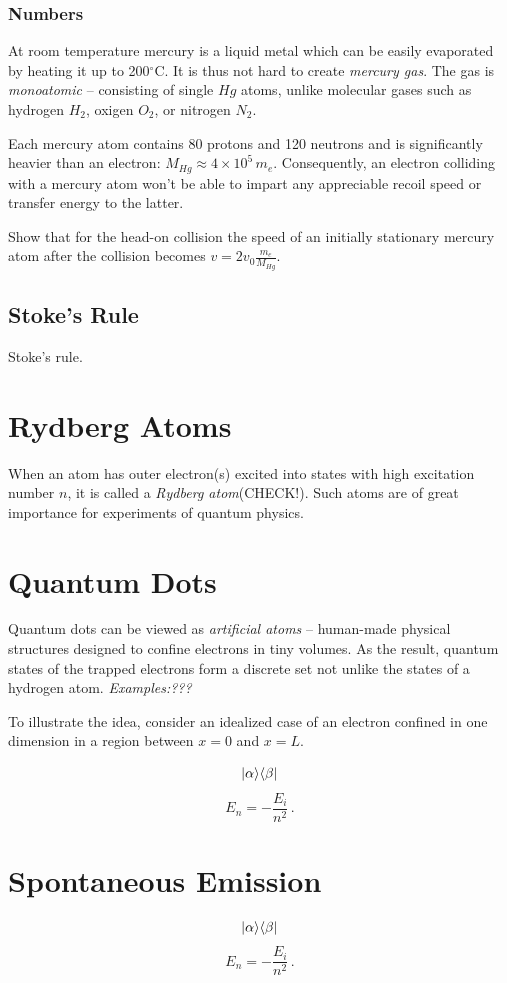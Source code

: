 \subsubsection*{Numbers}
At room temperature mercury is a liquid metal which can be easily evaporated by heating it up to 200$^\circ$C. It is thus not hard to create \emph{mercury gas}. The gas is \emph{monoatomic} -- consisting of single $Hg$ atoms, unlike molecular gases such as hydrogen $H_2$, oxigen $O_2$, or nitrogen $N_2$.

Each mercury atom contains 80 protons and 120 neutrons and is significantly heavier than an electron: $M_{Hg}\approx 4\times 10^5\,m_e$.  Consequently, an electron colliding with a mercury atom won't be able to impart any appreciable recoil speed or transfer energy to the latter. 
\begin{exercise}
	Show that for the head-on collision the speed of an initially stationary mercury atom after the collision becomes $v=2v_0\frac{m_e}{M_{Hg}}$.
\end{exercise}

\subsection{Stoke's Rule}
Stoke's rule.

\section{Rydberg Atoms}
When an atom has outer electron(s) excited into states with high excitation number  $n$, it is called a \emph{Rydberg atom}(CHECK!). Such atoms are of great importance for experiments of quantum physics.

\section{Quantum Dots}
Quantum dots can be viewed as \emph{artificial atoms} -- human-made physical structures designed to confine electrons in tiny volumes. As the result, quantum states of the trapped electrons form a discrete set not unlike the states of a hydrogen atom. \emph{Examples:???}

To illustrate the idea, consider an idealized case of an electron confined in one dimension in a region between $x=0$ and $x=L$.

\[
|{\alpha}\rangle\langle{\beta}|
\]
\[
E_n = -\frac{E_i}{n^2}\,.
\]

\section{Spontaneous Emission}
\[
|{\alpha}\rangle\langle{\beta}|
\]
\[
E_n = -\frac{E_i}{n^2}\,.
\]

